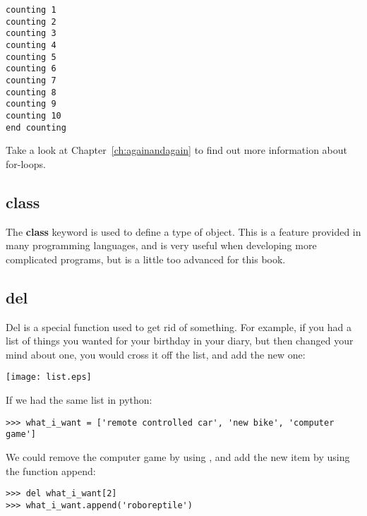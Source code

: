 \begin{Verbatim}[frame=single]
counting 1
counting 2
counting 3
counting 4
counting 5
counting 6
counting 7
counting 8
counting 9
counting 10
end counting
\end{Verbatim}

\noindent
Take a look at Chapter~\ref{ch:againandagain} to find out more information about for-loops.

\subsection*{class}

The \textbf{class} keyword is used to define a type of object. This is a feature provided in many programming languages, and is very useful when developing more complicated programs, but is a little too advanced for this book.

\subsection*{del}

Del is a special function used to get rid of something. For example, if you had a list of things you wanted for your birthday in your diary, but then changed your mind about one, you would cross it off the list, and add the new one:

\begin{center}
\texttt{[image: list.eps]}
\end{center}

\noindent
If we had the same list in python:

\begin{Verbatim}[frame=single]
>>> what_i_want = ['remote controlled car', 'new bike', 'computer game']
\end{Verbatim}

\noindent
We could remove the computer game by using , and add the new item by using the function append:

\begin{Verbatim}[frame=single]
>>> del what_i_want[2]
>>> what_i_want.append('roboreptile')
\end{Verbatim}


